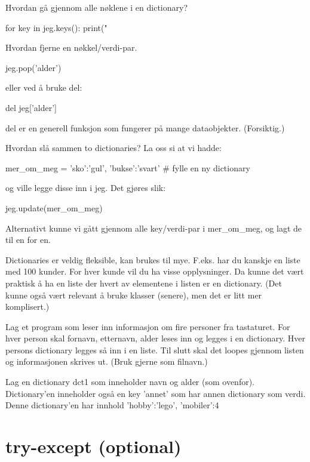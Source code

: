 Hvordan gå gjennom alle nøklene i en dictionary?
\begin{usncodebox}
for key in jeg.keys():
   print("  %
\end{usncodebox}

Hvordan fjerne en nøkkel/verdi-par. 
\begin{usncodebox}
jeg.pop('alder')
\end{usncodebox}

eller ved å bruke del: 
\begin{usncodebox}
del jeg['alder']
\end{usncodebox}

del er en generell funksjon som fungerer på mange dataobjekter. (Forsiktig.) 

Hvordan slå sammen to dictionaries?
La oss si at vi hadde:
\begin{usncodebox}
mer_om_meg = {'sko':'gul', 'bukse':'svart'}   # fylle en ny dictionary
\end{usncodebox}
og ville legge disse inn i jeg. Det gjøres slik:
\begin{usncodebox}
jeg.update(mer_om_meg)
\end{usncodebox}
Alternativt kunne vi gått gjennom alle key/verdi-par i mer\_{}om\_{}meg, og lagt de til en for en.

Dictionaries er veldig fleksible, kan brukes til mye. F.eks. har du kanskje en liste med 100 kunder. For hver kunde vil du ha visse opplysninger. Da kunne det vært praktisk å ha en liste der hvert av elementene i listen er en dictionary. (Det kunne også vært relevant å bruke klasser (senere), men det er litt mer komplisert.)

\begin{exercise}
Lag et program som leser inn informasjon om fire personer fra tastaturet. For hver person skal fornavn, etternavn, alder leses inn og legges i en dictionary. Hver persons dictionary legges så inn i en liste. Til slutt skal det loopes gjennom listen og informasjonen skrives ut. (Bruk gjerne  som filnavn.)
\end{exercise} 

\begin{exercise}
Lag en dictionary dct1 som inneholder navn og alder (som ovenfor). Dictionary'en inneholder også en key 'annet' som har annen dictionary som verdi. Denne dictionary'en har innhold {'hobby':'lego', 'mobiler':4}
\end{exercise}

\section{try-except (optional)}

